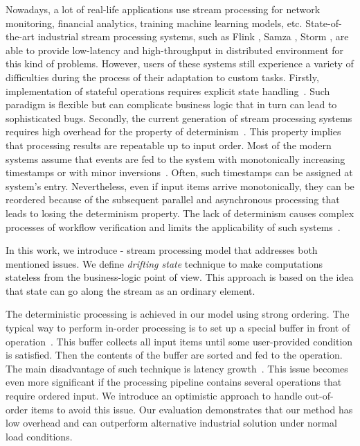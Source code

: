 
\label {fs-intro-seciton}

Nowadays, a lot of real-life applications use stream processing for network monitoring, financial analytics, training machine learning models, etc. State-of-the-art industrial stream processing systems, such as Flink \cite{carbone2015apache}, Samza \cite{Noghabi:2017:SSS:3137765.3137770}, Storm \cite{apache:storm}, are able to provide low-latency and high-throughput in distributed environment for this kind of problems. However, users of these systems still experience a variety of difficulties during the process of their adaptation to custom tasks. Firstly, implementation of stateful operations requires explicit state handling~\cite{apache:flink:state, apache:storm:state}. Such paradigm is flexible but can complicate business logic that in turn can lead to sophisticated bugs. Secondly, the current generation of stream processing systems requires high overhead for the property of determinism~\cite{Zacheilas:2017:MDS:3093742.3093921}. This property implies that processing results are repeatable up to input order. Most of the modern systems assume that events are fed to the system with monotonically increasing timestamps or with minor inversions~\cite{Wei:2009:SSO:1559845.1559973}. Often, such timestamps can be assigned at system's entry. Nevertheless, even if input items arrive monotonically, they can be reordered because of the subsequent parallel and asynchronous processing that leads to losing the determinism property. The lack of determinism causes complex processes of workflow verification and limits the applicability of such systems~\cite{Stonebraker:2005:RRS:1107499.1107504, Zacheilas:2017:MDS:3093742.3093921}.

In this work, we introduce \FlameStream - stream processing model that addresses both mentioned issues. We define {\it drifting state} technique to make computations stateless from the business-logic point of view. This approach is based on the idea that state can go along the stream as an ordinary element. 

The deterministic processing is achieved in our model using strong ordering. The typical way to perform in-order processing is to set up a special buffer in front of operation~\cite{Li:2008:OPN:1453856.1453890}. This buffer collects all input items until some user-provided condition is satisfied. Then the contents of the buffer are sorted and fed to the operation. The main disadvantage of such technique is latency growth~\cite{Zacheilas:2017:MDS:3093742.3093921}. This issue becomes even more significant if the processing pipeline contains several operations that require ordered input. We introduce an optimistic approach to handle out-of-order items to avoid this issue. Our evaluation demonstrates that our method has low overhead and can outperform alternative industrial solution under normal load conditions.

